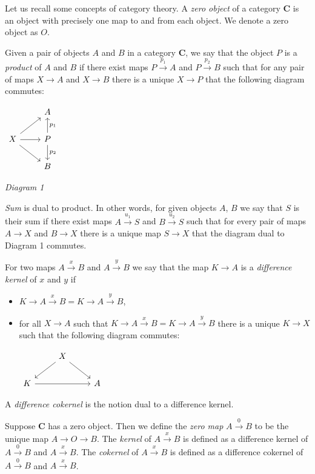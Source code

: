 \documentclass[letterpaper,11pt]{article}
\begin{document}
	Let us recall some concepts of category theory.
	A \textit{zero object} of a category $\boldsymbol{C}$ is an object with precisely one map to and from each object. We denote a zero object as $O$.
	
	Given a pair of objects $A$ and $B$ in a category $\boldsymbol{C}$, we say that the object $P$ is a \textit{product} of $A$ and $B$ if there exist maps $P \xrightarrow{p_1} A$ and $P \xrightarrow{p_2} B$ such that for any pair of maps $X \rightarrow A$ and $X \rightarrow B$ there is a unique $X \rightarrow P$ that the following diagram commutes:
	\begin{center}
		$\begin{tikzcd}
		& A \\
		X \arrow[ru] \arrow[r] \arrow[rd] & P \arrow[u,"p_1", pos=0.5, swap] \arrow[d, "p_2"] \\
		& B
		\end{tikzcd}$
		
		\textit{Diagram 1}
	\end{center}

	\textit{Sum} is dual to product. In other words, for given objects $A$, $B$ we say that $S$ is their sum if there exist maps $A \xrightarrow{u_1} S$ and $B \xrightarrow{u_2} S$ such that for every pair of maps $A \rightarrow X$ and $B \rightarrow X$ there is a unique map $S \rightarrow X$ that the  diagram dual to Diagram 1 commutes.
	
	For two maps $A \xrightarrow{x} B$ and $A \xrightarrow{y} B$ we say that the map $K \rightarrow A$ is a \textit{difference kernel} of $x$ and $y$ if 
	\begin{itemize}
		\item $K \rightarrow A \xrightarrow{x} B = K \rightarrow A \xrightarrow{y} B$,
		\item for all $X \rightarrow A$ such that $K \rightarrow A \xrightarrow{x} B = K \rightarrow A \xrightarrow{y} B$ there is a unique $K \rightarrow X$ such that the following diagram commutes:
		\begin{center}
			$\begin{tikzcd}
			& X \ar[rd] \ar[ld] \\
			K \ar[rr] & & A
			\end{tikzcd}$
		\end{center}
	\end{itemize}

	A \textit{difference cokernel} is the notion dual to a difference kernel.

	Suppose $\boldsymbol{C}$ has a zero object. Then we define the \textit{zero map} $A \xrightarrow{0} B$ to be the unique map $A \rightarrow O \rightarrow B$. The \textit{kernel} of $A \xrightarrow{x} B$ is defined as a difference kernel of $A \xrightarrow{0} B$ and $A \xrightarrow{x} B$. The \textit{cokernel} of $A \xrightarrow{x} B$ is defined as a difference cokernel of $A \xrightarrow{0} B$ and $A \xrightarrow{x} B$.
		
\end{document}
